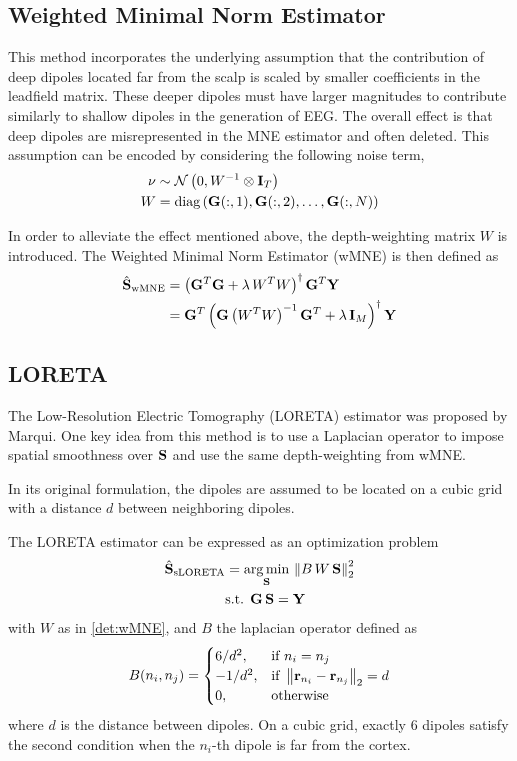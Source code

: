 \subsection{Weighted Minimal Norm Estimator}
\label{sec:wMNE}

This method incorporates the underlying assumption that the contribution of deep dipoles located far from the scalp is scaled by smaller coefficients in the leadfield matrix.
%
These deeper dipoles must have larger magnitudes to contribute similarly to shallow dipoles in the generation of EEG.
%
The overall effect is that deep dipoles are misrepresented in the MNE estimator and often deleted.
%
This assumption can be encoded by considering the following noise term,
\begin{align}
\nu &\sim
\mathcal{N}\left( 
0, 
W^{-1} \otimes \mathbf{I}_T
 \right)
\\
W &=
\text{diag}\left(   \mathbf{G}(:,1), \mathbf{G}(:,2), \dots, \mathbf{G}(:,N)   \right)
\label{det:wMNE}
\end{align}

In order to alleviate the effect mentioned above, the depth-weighting matrix $W$ is introduced.
%
The Weighted Minimal Norm Estimator (wMNE) is then defined as
\begin{align}
\hat{\mathbf{S}}_\text{wMNE} 
&=
\left( \mathbf{G}^T \mathbf{G} + \lambda\, W^T W \right)^\dagger \mathbf{G}^T \mathbf{Y} \\
&=
\mathbf{G}^T
\left( \mathbf{G} \left( W^T W \right)^{-1} \mathbf{G}^T + \lambda\, \mathbf{I}_M \right)^\dagger \mathbf{Y}
\label{est:wMNE}
\end{align}

\subsection{LORETA}

The Low-Resolution Electric Tomography (LORETA) estimator was proposed by Marqui\cite{sloreta}.
%
One key idea from this method is to use a Laplacian operator to impose spatial smoothness over $\mathbf{S}$ and use the same depth-weighting from wMNE.

In its original formulation, the dipoles are assumed to be located on a cubic grid with a distance $d$ between neighboring dipoles. 

The LORETA estimator can be expressed as an optimization problem
\begin{align}
\hat{\mathbf{S}}_\text{sLORETA} 
&=
\operatorname*{arg\,min}_{\mathbf{S}} \,
\left\lVert  B\, W\, \mathbf{S}  \right\rVert _2^2 
\nonumber \\
&\text{s.t. }
\mathbf{G}\, \mathbf{S} = \mathbf{Y}
\end{align}
with $W$ as in \eqref{det:wMNE}, and $B$ the laplacian operator defined as
\begin{equation}
B(n_i, n_j) =
\begin{cases}
6/d^2, &\text{if } n_i=n_j \\
-1/d^2, &\text{if } \left\lVert \mathbf{r}_{n_i}-\mathbf{r}_{n_j} \right\rVert_2 = d \\
0, &\text{otherwise}
\end{cases}
\end{equation}
where $d$ is the distance between dipoles. On a cubic grid, exactly 6 dipoles satisfy the second condition when the $n_i$-th dipole is far from the cortex.

